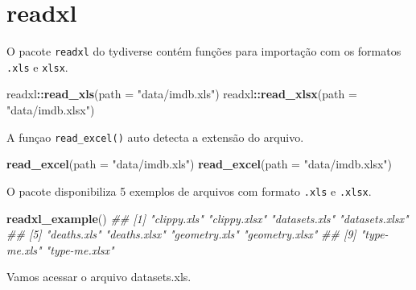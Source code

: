 \documentclass[
]{book}
\newenvironment{Shaded}{\begin{snugshade}}{\end{snugshade}}
\newcommand{\CommentTok}[1]{\textcolor[rgb]{0.56,0.35,0.01}{\textit{#1}}}
\newcommand{\DataTypeTok}[1]{\textcolor[rgb]{0.13,0.29,0.53}{#1}}
\newcommand{\KeywordTok}[1]{\textcolor[rgb]{0.13,0.29,0.53}{\textbf{#1}}}
\newcommand{\NormalTok}[1]{#1}
\newcommand{\OperatorTok}[1]{\textcolor[rgb]{0.81,0.36,0.00}{\textbf{#1}}}
\newcommand{\StringTok}[1]{\textcolor[rgb]{0.31,0.60,0.02}{#1}}
\begin{document}
\hypertarget{readxl}{%
\section{readxl}\label{readxl}}

O pacote \texttt{readxl} do tydiverse contém funções para importação com os formatos \texttt{.xls} e \texttt{xlsx}.

\begin{Shaded}
\begin{Highlighting}[]
\NormalTok{readxl}\OperatorTok{::}\KeywordTok{read_xls}\NormalTok{(}\DataTypeTok{path =} \StringTok{"data/imdb.xls"}\NormalTok{)}
\NormalTok{readxl}\OperatorTok{::}\KeywordTok{read_xlsx}\NormalTok{(}\DataTypeTok{path =} \StringTok{"data/imdb.xlsx"}\NormalTok{)}
\end{Highlighting}
\end{Shaded}

A funçao \texttt{read\_excel()} auto detecta a extensão do arquivo.

\begin{Shaded}
\begin{Highlighting}[]
\KeywordTok{read_excel}\NormalTok{(}\DataTypeTok{path =} \StringTok{"data/imdb.xls"}\NormalTok{)}
\KeywordTok{read_excel}\NormalTok{(}\DataTypeTok{path =} \StringTok{"data/imdb.xlsx"}\NormalTok{)}
\end{Highlighting}
\end{Shaded}

O pacote disponibiliza 5 exemplos de arquivos com formato \texttt{.xls} e \texttt{.xlsx}.

\begin{Shaded}
\begin{Highlighting}[]
\KeywordTok{readxl_example}\NormalTok{()}
\CommentTok{##  [1] "clippy.xls"    "clippy.xlsx"   "datasets.xls"  "datasets.xlsx"}
\CommentTok{##  [5] "deaths.xls"    "deaths.xlsx"   "geometry.xls"  "geometry.xlsx"}
\CommentTok{##  [9] "type-me.xls"   "type-me.xlsx"}
\end{Highlighting}
\end{Shaded}

Vamos acessar o arquivo datasets.xls.
\end{document}
